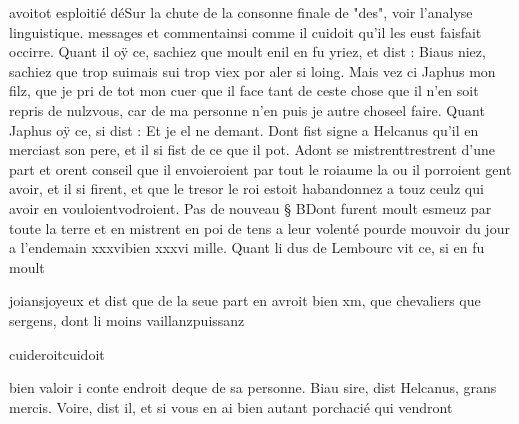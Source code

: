 \documentclass{article}
\begin{document}
\begin{pages}
                  avoitot esploitié déSur la chute de la consonne finale de
                  "des", voir l'analyse linguistique. messages et 
                  commentainsi comme il cuidoit qu’il les eust 
                     faisfait occirre. Quant il oÿ ce, sachiez que moult 
                  enil en fu yriez, et dist : Biaus niez, sachiez que 
                     trop suimais sui trop viex por aler si loing. Mais vez ci Japhus mon filz, que je pri de tot mon cuer que il face tant de
                  ceste chose que il n’en soit repris de 
                     nulzvous, car de ma personne n’en puis je 
                     autre choseel faire. Quant Japhus oÿ ce, si dist
               : Et je el ne demant. Dont fist signe a
                  Helcanus qu’il en merciast son pere, et il si fist de ce que il pot. Adont se 
                  mistrenttrestrent d’une part et orent conseil que il
                  envoieroient par tout le roiaume la ou il porroient gent avoir, et il si
               firent, et que le tresor le roi estoit habandonnez a touz ceulz qui avoir en 
                  vouloientvodroient. \pend
            \pstart Pas de nouveau § BDont furent
               moult esmeuz par toute la terre et en mistrent en poi de tens a leur volenté 
                  pourde mouvoir du jour a l’endemain 
                  xxxvibien xxxvi mille. Quant li dus de Lembourc vit ce, si en fu 
                  moult
               
                  joiansjoyeux et dist que de la seue part en avroit 
                     bien
                  xm, que chevaliers que sergens, dont li moins 
                     vaillanzpuissanz
                  
                     cuideroitcuidoit
                  
                     bien valoir i conte endroit 
                     deque de sa
               personne.
                  Biau sire, dist Helcanus, grans mercis.
               Voire, dist il, et si vous en ai bien autant
                  porchacié qui vendront 
                     

\end{pages}
\end{document}
